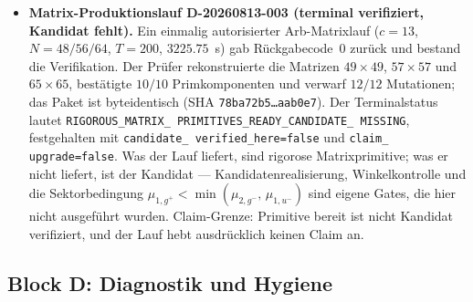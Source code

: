 \documentclass[12pt,a4paper]{article}
\theoremstyle{definition}
\theoremstyle{remark}
\begin{document}
\begin{itemize}
  \item \textbf{Matrix-Produktionslauf D-20260813-003 (terminal
    verifiziert, Kandidat fehlt).} Ein einmalig autorisierter
    Arb-Matrixlauf ($c = 13$, $N = 48/56/64$, $T = 200$, $3225.75$~s) gab
    Rückgabecode~$0$ zurück und bestand die Verifikation. Der Prüfer
    rekonstruierte die Matrizen $49\times 49$, $57\times 57$ und
    $65\times 65$, bestätigte $10/10$ Primkomponenten und verwarf $12/12$
    Mutationen; das Paket ist byteidentisch (SHA
    \texttt{78ba72b5\ldots aab0e7}). Der Terminalstatus lautet
    \texttt{RIGOROUS\_\allowbreak MATRIX\_\allowbreak
    PRIMITIVES\_\allowbreak READY\_\allowbreak CANDIDATE\_\allowbreak
    MISSING}, festgehalten mit \texttt{candidate\_\allowbreak
    verified\_\allowbreak here=false} und \texttt{claim\_\allowbreak
    upgrade=false}. Was der Lauf liefert, sind rigorose Matrixprimitive;
    was er nicht liefert, ist der Kandidat --- Kandidatenrealisierung,
    Winkelkontrolle und die Sektorbedingung
    $\mu_{1,g^+} < \min(\mu_{2,g^-},\, \mu_{1,u^-})$ sind eigene Gates, die
    hier nicht ausgeführt wurden. Claim-Grenze: Primitive bereit ist nicht
    Kandidat verifiziert, und der Lauf hebt ausdrücklich keinen Claim an.
\end{itemize}

\subsection{Block D: Diagnostik und Hygiene}
\label{sec:v32-block-d}
\end{document}
